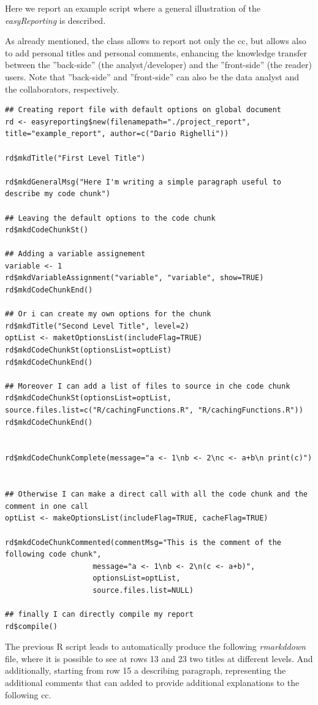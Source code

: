 Here we report an example script where a general illustration of the \textit{easyReporting} is described.

As already mentioned, the class allows to report not only the \gls{cc}, but allows also to add personal titles and personal comments, enhancing the knowledge transfer between the ''back-side'' (the analyst/developer) and the ''front-side'' (the reader) users.
Note that ''back-side'' and ''front-side'' can also be the data analyst and the collaborators, respectively.

\begin{lstlisting}
## Creating report file with default options on global document
rd <- easyreporting$new(filenamepath="./project_report", title="example_report", author=c("Dario Righelli"))

rd$mkdTitle("First Level Title")

rd$mkdGeneralMsg("Here I'm writing a simple paragraph useful to describe my code chunk")

## Leaving the default options to the code chunk
rd$mkdCodeChunkSt()

## Adding a variable assignement
variable <- 1
rd$mkdVariableAssignment("variable", "variable", show=TRUE)
rd$mkdCodeChunkEnd()

## Or i can create my own options for the chunk
rd$mkdTitle("Second Level Title", level=2)
optList <- maketOptionsList(includeFlag=TRUE)
rd$mkdCodeChunkSt(optionsList=optList)
rd$mkdCodeChunkEnd()

## Moreover I can add a list of files to source in che code chunk
rd$mkdCodeChunkSt(optionsList=optList, source.files.list=c("R/cachingFunctions.R", "R/cachingFunctions.R"))
rd$mkdCodeChunkEnd()


rd$mkdCodeChunkComplete(message="a <- 1\nb <- 2\nc <- a+b\n print(c)")


## Otherwise I can make a direct call with all the code chunk and the comment in one call
optList <- makeOptionsList(includeFlag=TRUE, cacheFlag=TRUE)

rd$mkdCodeChunkCommented(commentMsg="This is the comment of the following code chunk",
                    message="a <- 1\nb <- 2\n(c <- a+b)",
                    optionsList=optList,
                    source.files.list=NULL)

## finally I can directly compile my report
rd$compile()
\end{lstlisting}
 
The previous R script leads to automatically produce the following \textit{rmarkddown} file, where it is possible to see at rows 13 and 23 two titles at different levels.
And additionally, starting from row 15 a describing paragraph, representing the additional comments that can added to provide additional explanations to the following \gls{cc}.

